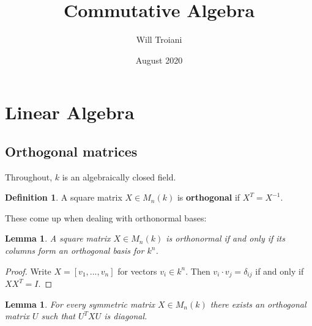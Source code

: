 \documentclass[12pt]{article}
\title{Commutative Algebra}
\author{Will Troiani}
\date{August 2020}
\theoremstyle{plain}
\newtheorem{lemma}[thm]{Lemma}
\theoremstyle{definition}
\newtheorem{defn}[thm]{Definition} %
\begin{document}
	
	\maketitle
	\tableofcontents
	
	\section{Linear Algebra}
	\subsection{Orthogonal matrices}
	Throughout, $k$ is an algebraically closed field.
	\begin{defn}
		A square matrix $X \in M_n(k)$ is \textbf{orthogonal} if $X^T = X^{-1}$.
	\end{defn}
	These come up when dealing with orthonormal bases:
	\begin{lemma}
		\label{lem:orthonormal} A square matrix $X \in M_n(k)$ is orthonormal if and only if its columns form an orthogonal basis for $k^n$.
	\end{lemma}
	\begin{proof}
		Write $X = [v_1, ..., v_n]$ for vectors $v_i \in k^n$. Then $v_i\cdot v_j = \delta_{ij}$ if and only if $XX^T = I$.
	\end{proof}
	\begin{lemma}
		\label{lem:symm_diag} For every symmetric matrix $X \in M_n(k)$ there exists an orthogonal matrix $U$ such that $U^TXU$ is diagonal.
	\end{lemma}
\end{document}
